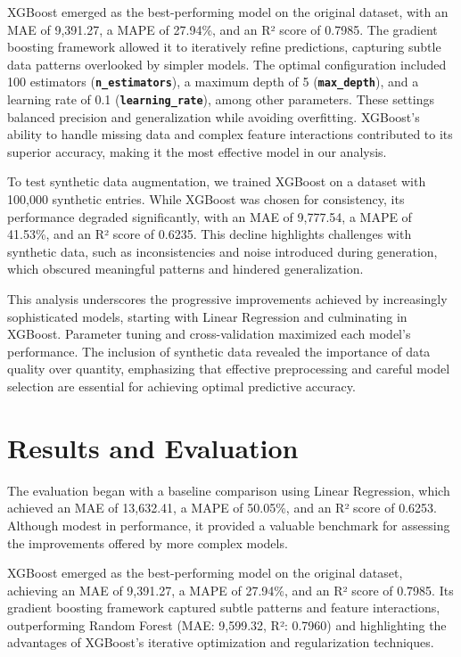 \documentclass[a4paper,oneside,bibliography=totoc]{scrbook}
\begin{document}
XGBoost emerged as the best-performing model on the original dataset, with an MAE of 9,391.27, a MAPE of 27.94\%, and an R² score of 0.7985. The gradient boosting framework allowed it to iteratively refine predictions, capturing subtle data patterns overlooked by simpler models. The optimal configuration included 100 estimators (\textbf{\texttt{n\_estimators}}), a maximum depth of 5 (\textbf{\texttt{max\_depth}}), and a learning rate of 0.1 (\textbf{\texttt{learning\_rate}}), among other parameters. These settings balanced precision and generalization while avoiding overfitting. XGBoost's ability to handle missing data and complex feature interactions contributed to its superior accuracy, making it the most effective model in our analysis.

To test synthetic data augmentation, we trained XGBoost on a dataset with 100,000 synthetic entries. While XGBoost was chosen for consistency, its performance degraded significantly, with an MAE of 9,777.54, a MAPE of 41.53\%, and an R² score of 0.6235. This decline highlights challenges with synthetic data, such as inconsistencies and noise introduced during generation, which obscured meaningful patterns and hindered generalization.

This analysis underscores the progressive improvements achieved by increasingly sophisticated models, starting with Linear Regression and culminating in XGBoost. Parameter tuning and cross-validation maximized each model's performance. The inclusion of synthetic data revealed the importance of data quality over quantity, emphasizing that effective preprocessing and careful model selection are essential for achieving optimal predictive accuracy.

\chapter{Results and Evaluation}
\label{cha:resultsAndEvaluation}

The evaluation began with a baseline comparison using Linear Regression, which achieved an MAE of 13,632.41, a MAPE of 50.05\%, and an R² score of 0.6253. Although modest in performance, it provided a valuable benchmark for assessing the improvements offered by more complex models.

XGBoost emerged as the best-performing model on the original dataset, achieving an MAE of 9,391.27, a MAPE of 27.94\%, and an R² score of 0.7985. Its gradient boosting framework captured subtle patterns and feature interactions, outperforming Random Forest (MAE: 9,599.32, R²: 0.7960) and highlighting the advantages of XGBoost's iterative optimization and regularization techniques.
\end{document}

